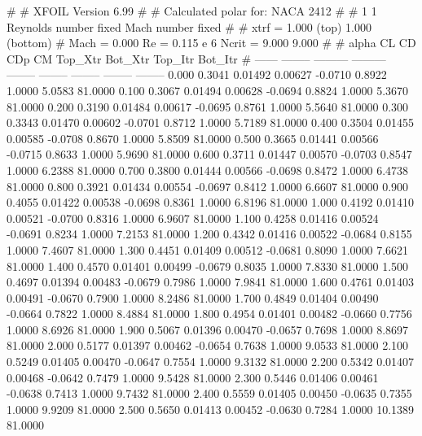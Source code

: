 #  
#       XFOIL         Version 6.99
#  
# Calculated polar for: NACA 2412                                       
#  
# 1 1 Reynolds number fixed          Mach number fixed         
#  
# xtrf =   1.000 (top)        1.000 (bottom)  
# Mach =   0.000     Re =     0.115 e 6     Ncrit =   9.000  9.000
#  
#   alpha    CL        CD       CDp       CM     Top_Xtr  Bot_Xtr  Top_Itr  Bot_Itr
#  ------ -------- --------- --------- -------- -------- -------- -------- --------
   0.000   0.3041   0.01492   0.00627  -0.0710   0.8922   1.0000   5.0583  81.0000
   0.100   0.3067   0.01494   0.00628  -0.0694   0.8824   1.0000   5.3670  81.0000
   0.200   0.3190   0.01484   0.00617  -0.0695   0.8761   1.0000   5.5640  81.0000
   0.300   0.3343   0.01470   0.00602  -0.0701   0.8712   1.0000   5.7189  81.0000
   0.400   0.3504   0.01455   0.00585  -0.0708   0.8670   1.0000   5.8509  81.0000
   0.500   0.3665   0.01441   0.00566  -0.0715   0.8633   1.0000   5.9690  81.0000
   0.600   0.3711   0.01447   0.00570  -0.0703   0.8547   1.0000   6.2388  81.0000
   0.700   0.3800   0.01444   0.00566  -0.0698   0.8472   1.0000   6.4738  81.0000
   0.800   0.3921   0.01434   0.00554  -0.0697   0.8412   1.0000   6.6607  81.0000
   0.900   0.4055   0.01422   0.00538  -0.0698   0.8361   1.0000   6.8196  81.0000
   1.000   0.4192   0.01410   0.00521  -0.0700   0.8316   1.0000   6.9607  81.0000
   1.100   0.4258   0.01416   0.00524  -0.0691   0.8234   1.0000   7.2153  81.0000
   1.200   0.4342   0.01416   0.00522  -0.0684   0.8155   1.0000   7.4607  81.0000
   1.300   0.4451   0.01409   0.00512  -0.0681   0.8090   1.0000   7.6621  81.0000
   1.400   0.4570   0.01401   0.00499  -0.0679   0.8035   1.0000   7.8330  81.0000
   1.500   0.4697   0.01394   0.00483  -0.0679   0.7986   1.0000   7.9841  81.0000
   1.600   0.4761   0.01403   0.00491  -0.0670   0.7900   1.0000   8.2486  81.0000
   1.700   0.4849   0.01404   0.00490  -0.0664   0.7822   1.0000   8.4884  81.0000
   1.800   0.4954   0.01401   0.00482  -0.0660   0.7756   1.0000   8.6926  81.0000
   1.900   0.5067   0.01396   0.00470  -0.0657   0.7698   1.0000   8.8697  81.0000
   2.000   0.5177   0.01397   0.00462  -0.0654   0.7638   1.0000   9.0533  81.0000
   2.100   0.5249   0.01405   0.00470  -0.0647   0.7554   1.0000   9.3132  81.0000
   2.200   0.5342   0.01407   0.00468  -0.0642   0.7479   1.0000   9.5428  81.0000
   2.300   0.5446   0.01406   0.00461  -0.0638   0.7413   1.0000   9.7432  81.0000
   2.400   0.5559   0.01405   0.00450  -0.0635   0.7355   1.0000   9.9209  81.0000
   2.500   0.5650   0.01413   0.00452  -0.0630   0.7284   1.0000  10.1389  81.0000
